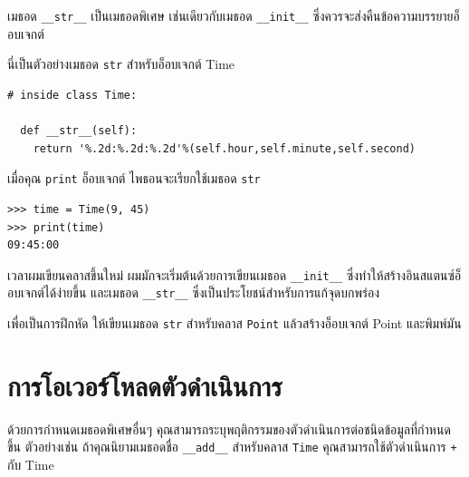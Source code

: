 เมธอด \verb"__str__" เป็นเมธอดพิเศษ เช่นเดียวกับเมธอด \verb"__init__" ซึ่งควรจะส่งคืนข้อความบรรยายอ็อบเจกต์

นี่เป็นตัวอย่างเมธอด {\tt str} สำหรับอ็อบเจกต์ Time

\begin{Verbatim}
# inside class Time:

  def __str__(self):
    return '%.2d:%.2d:%.2d'%(self.hour,self.minute,self.second)
\end{Verbatim}
%
เมื่อคุณ {\tt print} อ็อบเจกต์ ไพธอนจะเรียกใช้เมธอด {\tt str}

\begin{verbatim}
>>> time = Time(9, 45)
>>> print(time)
09:45:00
\end{verbatim}
%

เวลาผมเขียนคลาสขึ้นใหม่ ผมมักจะเริ่มต้นด้วยการเขียนเมธอด \verb"__init__" ซึ่งทำให้สร้างอินสแตนซ์อ็อบเจกต์ได้ง่ายขึ้น 
และเมธอด \verb"__str__"  ซึ่งเป็นประโยชน์สำหรับการแก้จุดบกพร่อง


เพื่อเป็นการฝึกหัด ให้เขียนเมธอด {\tt str} สำหรับคลาส {\tt Point} แล้วสร้างอ็อบเจกต์ Point และพิมพ์มัน

\section{การโอเวอร์โหลดตัวดำเนินการ} %
\label{operator.overloading}


ด้วยการกำหนดเมธอดพิเศษอื่นๆ คุณสามารถระบุพฤติกรรมของตัวดำเนินการต่อชนิดข้อมูลที่กำหนดขึ้น 
ตัวอย่างเช่น ถ้าคุณนิยามเมธอดชื่อ \verb"__add__" สำหรับคลาส {\tt Time} คุณสามารถใช้ตัวดำเนินการ {\tt +} กับ Time

